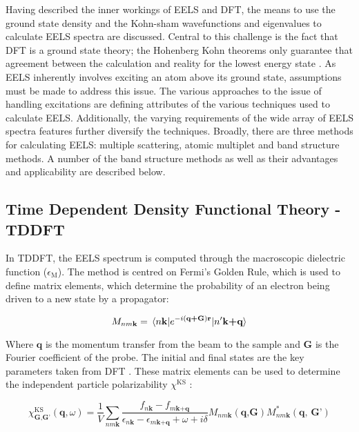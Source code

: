 
Having described the inner workings of EELS and DFT, the means to use the ground state density and the Kohn-sham wavefunctions and eigenvalues to calculate EELS spectra are discussed.  Central to this challenge is the fact that DFT is a ground state theory; the Hohenberg Kohn theorems only guarantee that agreement between the calculation and reality for the lowest energy state \cite{hohenberg_inhomogeneous_1964}. As EELS inherently involves exciting an atom above its ground state, assumptions must be made to address this issue. The various approaches to the issue of handling excitations are defining attributes of the various techniques used to calculate EELS.  Additionally, the varying requirements of the wide array of EELS spectra features further diversify the techniques. Broadly, there are three methods for calculating EELS: multiple scattering, atomic multiplet and band structure methods.  A number of the band structure methods as well as their advantages and applicability are described below.


\subsection{Time Dependent Density Functional Theory -TDDFT}
In TDDFT, the EELS spectrum is computed through the macroscopic dielectric function ($\epsilon_{\mathrm{M}}$). The method is centred on Fermi's Golden Rule, which is used to define matrix elements, which determine the probability of an electron being driven to a new state by a propagator:

\begin{equation}
M_{nm\textbf{k}} = \mel{n\textbf{k}}{e^{-i(\textbf{q+G})\textbf{r}}}{n'\textbf{k+q}}
\label{FGR}
\end{equation}

Where $\textbf{q}$ is the momentum transfer from the beam to the sample and \textbf{G} is the Fourier coefficient of the probe. The initial and final states are the key parameters taken from DFT \cite{exciting}.  These matrix elements can be used to determine the independent particle polarizability $\chi^{\mathrm{KS}}$ \cite{exciting}: 


\begin{equation}
\chi^{\mathrm{KS}}_{\mathrm{\textbf{G,G'}}}(\textbf{q},\omega)=\frac{1}{V}\sum_{nm\textbf{k}}\frac{f_{n\textbf{k}}-f_{m\textbf{k+q}}}{\epsilon_{n\textbf{k}}-\epsilon_{m\textbf{k+q}}+\omega + i\delta} M_{nm\textbf{k}}(\textbf{q,G})M^*_{nm\textbf{k}}(\textbf{q, G'})
\end{equation}

